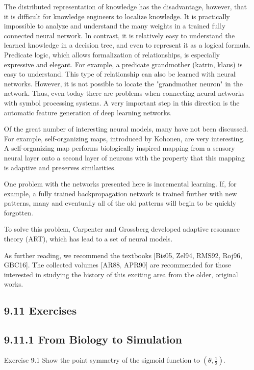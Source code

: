 \documentclass[10pt]{book}
\begin{document}
\begin{center}
\begin{enumerate}
\begin{center}
\begin{center}
\begin{center}
The distributed representation of knowledge has the disadvantage, however, that it is difficult for knowledge engineers to localize knowledge. It is practically impossible to analyze and understand the many weights in a trained fully connected neural network. In contrast, it is relatively easy to understand the learned knowledge in a decision tree, and even to represent it as a logical formula. Predicate logic, which allows formalization of relationships, is especially expressive and elegant. For example, a predicate grandmother (katrin, klaus) is easy to understand. This type of relationship can also be learned with neural networks. However, it is not possible to locate the "grandmother neuron" in the network. Thus, even today there are problems when connecting neural networks with symbol processing systems. A very important step in this direction is the automatic feature generation of deep learning networks.

Of the great number of interesting neural models, many have not been discussed. For example, self-organizing maps, introduced by Kohonen, are very interesting. A self-organizing map performs biologically inspired mapping from a sensory neural layer onto a second layer of neurons with the property that this mapping is adaptive and preserves similarities.

One problem with the networks presented here is incremental learning. If, for example, a fully trained backpropagation network is trained further with new patterns, many and eventually all of the old patterns will begin to be quickly forgotten.

To solve this problem, Carpenter and Grossberg developed adaptive resonance theory (ART), which has lead to a set of neural models.


As further reading, we recommend the textbooks [Bis05, Zel94, RMS92, Roj96, GBC16]. The collected volumes [AR88, APR90] are recommended for those interested in studying the history of this exciting area from the older, original works.

\subsection*{9.11 Exercises}
\subsection*{9.11.1 From Biology to Simulation}
Exercise 9.1 Show the point symmetry of the sigmoid function to $\left(\theta, \frac{1}{2}\right)$.


\end{center}
\end{center}
\end{center}
\end{enumerate}
\end{center}
\end{document}
